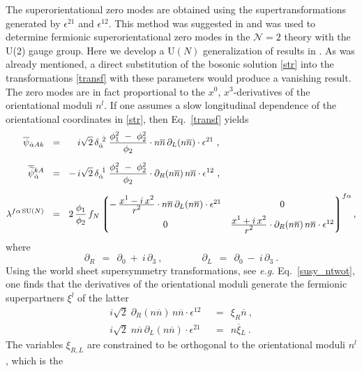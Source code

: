 \documentclass[12pt]{article}
\newcommand{\ntwo}{${\mathcal N}=2$ }
\newcommand{\p}{\partial}
\newcommand{\wt}{\widetilde}
\newcommand{\ov}{\overline}
\newcommand{\lgr}{\left\lgroup}
\newcommand{\rgr}{\right\rgroup}
\newcommand{\bxil}{\ov{\xi}{}_L}
\newcommand{\nbar}{\ov{n}}
\begin{document}
	The superorientational zero modes are obtained using the supertransformations generated by 
	$ \epsilon^{21} $ and $ \epsilon^{12} $. This method was suggested in 
\cite{SYmon} and was used to determine fermionic superorientational zero modes
in the \ntwo theory with the U(2) gauge group. Here we develop a U$(N)$ generalization of results
in \cite{SYmon}.
As was already mentioned, a direct substitution of the bosonic solution \eqref{str} into the transformations
	\eqref{transf} with these parameters would produce a vanishing result.
	The zero modes are in fact proportional to the $ x^0 $, $ x^3 $-derivatives of the orientational moduli $ n^l $.
	If one assumes a slow longitudinal dependence of the orientational coordinates in \eqref{str}, then Eq.~\eqref{transf}
	yields
\begin{align*}
%
	\ov{\psi}{}_{\dot{\alpha}Ak} & ~~=~~  \phantom{-\, } i\sqrt{2}\, \delta_{\dot{\alpha}}^{\ \dot{2}}\;
					\frac{\phi_1^2 ~-~ \phi_2^2}{\phi_2}\cdot n\nbar\, \p_L (n\nbar)\cdot \epsilon^{21}~,
	\\[2mm]
%
	\ov{\wt{\psi}}{}_{\dot{\alpha}}^{kA} & ~~=~~ -\,  i\sqrt{2}\, \delta_{\dot{\alpha}}^{\ \dot{1}}\;
					\frac{\phi_1^2 ~-~ \phi_2^2}{\phi_2}\cdot \p_R (n\nbar)\, n\nbar\cdot \epsilon^{12}~,
	\\[2mm]
%
	\lambda^{f\alpha\, \text{SU($N$)}} & ~~=~~ 
		2\, \frac{\phi_1}{\phi_2}\, f_N
	\lgr \begin{matrix}
			-\, \frac{\displaystyle x^1 - i\, x^2}{\displaystyle r^2}\cdot
				n\nbar\, \p_L(n\nbar)\cdot \epsilon^{21}                     &  0  \\[2mm]
			0 &
			    \frac{\displaystyle x^1 + i\, x^2}{\displaystyle r^2}\cdot 
				\p_R (n\nbar)\, n\nbar\cdot \epsilon^{12}
	     \end{matrix} \rgr^{f\alpha},
\end{align*}	
	where
\[	
	\p_R ~~=~~ \p_0 ~+~ i\, \p_3 ~, \qquad\qquad  \p_L ~~=~~ \p_0 ~-~ i\, \p_3~.
\]
	Using the world sheet supersymmetry transformations, see {\it e.g.} Eq.~\eqref{susy_ntwot}, one finds that 
	the derivatives of the orientational moduli generate the fermionic superpartners $ \xi^l $ of the latter
\begin{align*}
%
	i \sqrt{2}\; \p_R (n \nbar)\, n\nbar \cdot \epsilon^{12} & 
		~~=~~ \xi_R \nbar~,  \\[2mm]
%
	i \sqrt{2}\; n\nbar\, \p_L (n\nbar) \cdot \epsilon^{21} & 
		~~=~~ n \bxil~.
\end{align*}
	The variables $ \xi_{R,L} $ are constrained to be orthogonal to the orientational moduli $ n^l $, which is the
\end{document}
